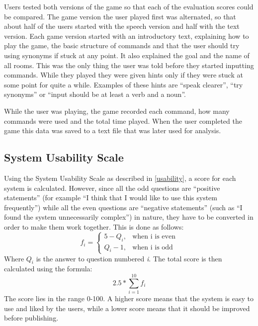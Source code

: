 Users tested both versions of the game so that each of the evaluation scores could be compared. The game version the user played first was alternated, so that about half of the users started with the speech version and half with the text version. Each game version started with an introductory text, explaining how to play the game, the basic structure of commands and that the user should try using synonyms if stuck at any point. It also explained the goal and the name of all rooms. This was the only thing the user was told before they started inputting commands. While they played they were given hints only if they were stuck at some point for quite a while. Examples of these hints are ``speak clearer'', ``try synonyms'' or ``input should be at least a verb and a noun''.

While the user was playing, the game recorded each command, how many commands were used and the total time played. When the user completed the game this data was saved to a text file that was later used for analysis.

\subsection{System Usability Scale} \label{sec:sus}
Using the System Usability Scale as described in \ref{usability}, a score for each system is calculated. However, since all the odd questions are ``positive statements'' (for example ``I think that I would like to use this system frequently'') while all the even questions are ``negative statements'' (such as ``I found the system unnecessarily complex'') in nature, they have to be converted in order to make them work together. This is done as follows: 
\begin{equation} \label{eq:convert}
	    f_{i} = 
	\begin{cases} 
	    5 - Q_{i}, & \text{when i is even}\\
	    Q_{i} - 1, & \text{when i is odd}
	\end{cases}
\end{equation}
Where \(Q_{i} \) is the answer to question numbered \textit{i}. The total score is then calculated using the formula: 
\begin{equation} \label{eq:sum}
	2.5 * \displaystyle \sum_{i=1}^{10} f_{i} 
\end{equation}
The score lies in the range 0-100. A higher score means that the system is easy to use and liked by the users, while a lower score means that it should be improved before publishing. \citep{Broo}

